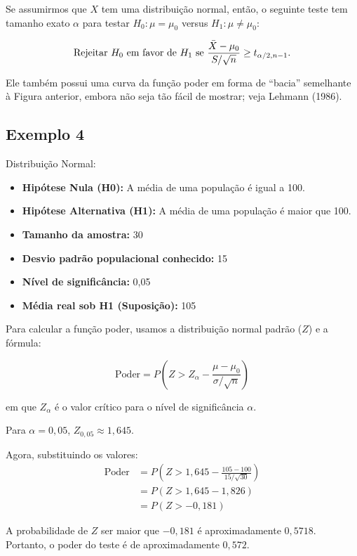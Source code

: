 \documentclass[12pt]{beamer}
\begin{document}
\begin{frame}{}
\begin{block}{}
\justifying
Se assumirmos que $X$ tem uma distribuição normal, então, o seguinte teste tem tamanho exato $\alpha$ para testar $H_0 : \mu = \mu_0$ versus $H_1 : \mu \neq \mu_0$:

\begin{align}
\text{Rejeitar } H_0 \text{ em favor de } H_1 \text{ se } \frac{\Bar{X} - \mu_0}{S/\sqrt{n}} \geq t_{\alpha/2, n-1}. 
\end{align}

Ele também possui uma curva da função poder em forma de ``bacia'' semelhante à Figura anterior, embora não seja tão fácil de mostrar; veja Lehmann (1986).
\end{block}
\end{frame}

\subsection{Exemplo 4}
\begin{frame}{}
\begin{block}{Distribuição Normal:}
\justifying

\begin{itemize}
\item \textbf{Hipótese Nula (H0):} A média de uma população é igual a 100.
\item \textbf{Hipótese Alternativa (H1):} A média de uma população é maior que 100.
\item \textbf{Tamanho da amostra:} 30
\item \textbf{Desvio padrão populacional conhecido:} 15
\item \textbf{Nível de significância:} 0,05
\item \textbf{Média real sob H1 (Suposição):} 105
\end{itemize}

Para calcular a função poder, usamos a distribuição normal padrão ($Z$) e a fórmula:

\[ \text{Poder} = P(Z > Z_{\alpha} - \frac{\mu - \mu_0}{\sigma/\sqrt{n}}) \]

em que $Z_{\alpha}$ é o valor crítico para o nível de significância $\alpha$.
\end{block}
\end{frame}

\begin{frame}{}
\begin{block}{}
\justifying
Para $\alpha = 0,05$, $Z_{0,05} \approx 1,645.$

Agora, substituindo os valores:
\begin{align*}
    \text{Poder} &= P(Z > 1,645 - \frac{105 - 100}{15/\sqrt{30}})\\
    &= P(Z > 1,645 - 1,826)\\
    &= P(Z > -0,181)
\end{align*}

A probabilidade de $Z$ ser maior que $-0,181$ é aproximadamente $0,5718$. Portanto, o poder do teste é de aproximadamente $0,572$.
\end{block}
\end{frame}
\end{document}
